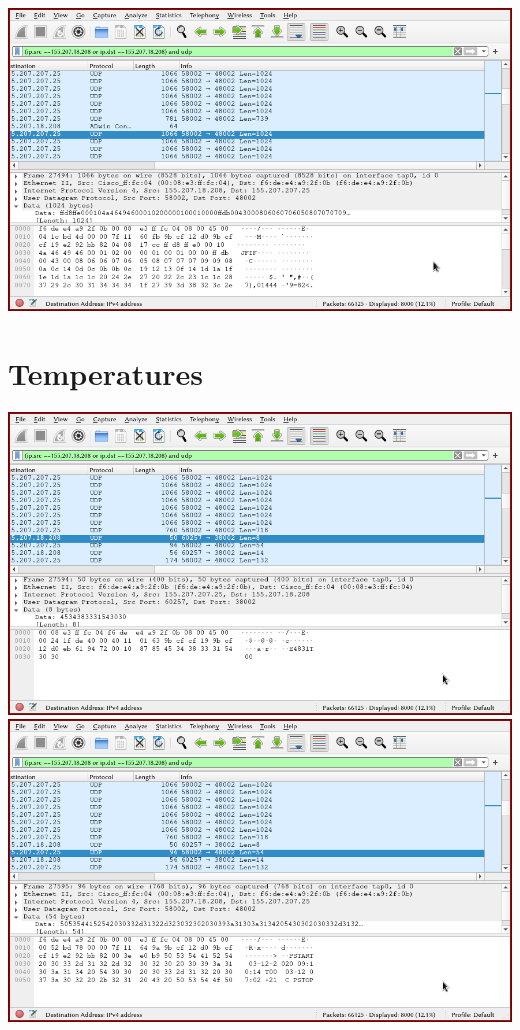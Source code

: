 \documentclass{article}
\begin{document}
\includegraphics[width=\textwidth]{wireshark6.png}

\section{Temperatures}
\includegraphics[width=\textwidth]{wireshark7.png}
\includegraphics[width=\textwidth]{wireshark8.png}
\end{document}
